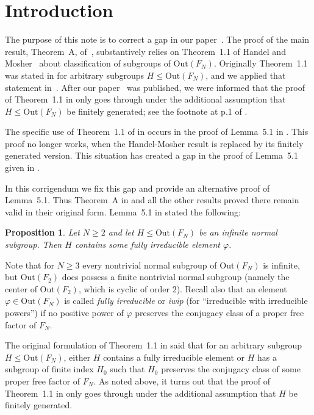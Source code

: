 \documentclass[10pt]{amsart}
\newcommand\<{\langle}
\renewcommand\>{\rangle}
\def\phi{\varphi}
\newcommand{\Out}{\mbox{Out}}
\newtheorem{prop}[thm]{Proposition}
\theoremstyle{definition}
\begin{document}

	
\section{Introduction}

The purpose of this note is to correct a gap in our
paper~\cite{CFKM}. The proof of the main result, Theorem~A, of~\cite{CFKM},
substantively relies on Theorem~1.1 of Handel and
Mosher~\cite{HM} about classification of subgroups of $\Out(F_N)$.
Originally Theorem~1.1 was stated in \cite{HM} for arbitrary subgroups
$H\le \Out(F_N)$, and we applied that statement in~\cite{CFKM}.  After
our paper~\cite{CFKM} was published, we were informed that the proof of Theorem~1.1 in \cite{HM} only goes through under
the additional assumption that $H\le\Out(F_N)$ be finitely generated;
see the footnote at p.1 of \cite{HM1}.

The specific use of Theorem~1.1 of \cite{HM} in \cite{CFKM} occurs in
the proof of Lemma~5.1 in \cite{CFKM}. This proof no longer works,
when the Handel-Mosher result is replaced by its finitely generated
version.  This situation has created a gap in the proof of Lemma~5.1 given
in \cite{CFKM}.

In this corrigendum we fix this gap and provide an alternative proof of Lemma~5.1. Thus Theorem~A in \cite{CFKM} and all the other results proved
there remain valid in their original form.  Lemma~5.1 in \cite{CFKM} stated the following:

\begin{prop}\label{prop:fix}
Let $N\ge 2$ and let $H\le \Out(F_N)$ be an infinite normal
subgroup. Then $H$ contains some fully irreducible element $\phi$.
\end{prop} 
Note that for $N\ge 3$ every nontrivial normal subgroup of
$\Out(F_N)$ is infinite, but $\Out(F_2)$ does possess a finite
nontrivial normal subgroup (namely the center of $\Out(F_2)$, which is
cyclic of order $2$). Recall also that an element $\phi\in\Out(F_N)$
is called \emph{fully irreducible} or \emph{iwip} (for ``irreducible
with irreducible powers'') if no positive power of $\phi$ preserves
the conjugacy class of a proper free factor of $F_N$.

The original formulation of Theorem~1.1 in \cite{HM} said that for an
arbitrary subgroup $H\le\Out(F_N)$, either $H$ contains a fully
irreducible element or $H$ has a subgroup of finite index $H_0$ such
that $H_0$ preserves the conjugacy class of some proper free factor of
$F_N$. As noted above, it turns out that the proof of
Theorem~1.1 in \cite{HM} only goes through under the additional
assumption that $H$ be finitely generated.
\end{document}

